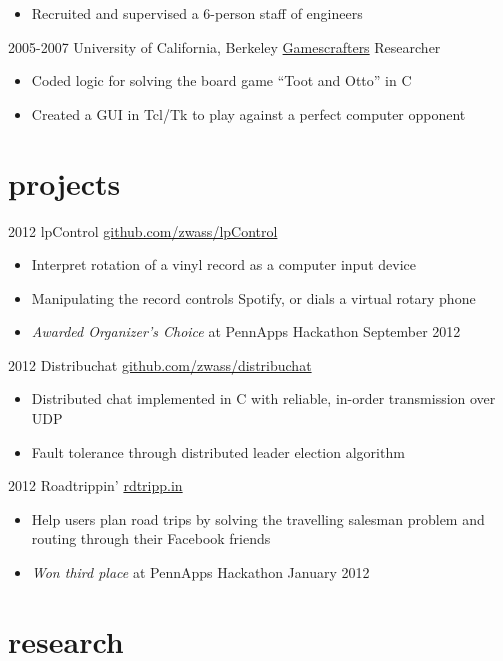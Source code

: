\documentclass[]{wasserman-cv}
\begin{document}
\begin{entrylist}
{\begin{itemize}
      \href{http://www.thedp.com}{thedp.com} in PHP
    \item Recruited and supervised a 6-person staff of engineers
    \end{itemize}
  }
  \entry
  {2005-2007}
  {University of California, Berkeley}
  {\href{http://gamescrafters.berkeley.edu/}{Gamescrafters} Researcher}
  {\begin{itemize}
    \item Coded logic for solving the board game ``Toot and Otto'' in C
    \item Created a GUI in Tcl/Tk to play against
      a perfect computer opponent
    \end{itemize}}
\end{entrylist}

\section{projects}

\begin{entrylist}
  \entry
  {2012}
  {lpControl}
  {\href{https://github.com/zwass/lpControl}{github.com/zwass/lpControl}}
  {\begin{itemize}
    \item Interpret rotation of a vinyl record as a computer input device
    \item Manipulating the record controls Spotify, or dials a virtual rotary phone
    \item \emph{Awarded Organizer's Choice} at PennApps Hackathon September
      2012
    \end{itemize}}
  \entry
  {2012}
  {Distribuchat}
  {\href{https://github.com/zwass/distribuchat}{github.com/zwass/distribuchat}}
  {\begin{itemize}
    \item Distributed chat implemented in C with
      reliable, in-order transmission over UDP
    \item Fault tolerance through distributed leader election algorithm
    \end{itemize}}
  \entry
  {2012}
  {Roadtrippin'}
  {\href{http://rdtripp.in}{rdtripp.in}}
  {\begin{itemize}
    \item Help users plan road trips by solving the travelling
      salesman problem and routing through their Facebook friends
    \item \emph{Won third place} at PennApps Hackathon January 2012
    \end{itemize}}
\end{entrylist}

\section{research}
\vspace{2\parskip}
\printbibliography[type=inproceedings, heading=none]
\end{document}

